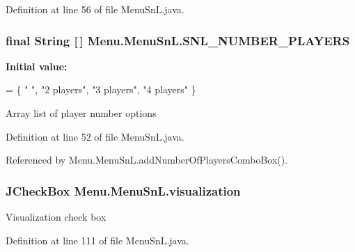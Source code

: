 Definition at line 56 of file Menu\+Sn\+L.\+java.

\hypertarget{class_menu_1_1_menu_sn_l_accdb88464884a651bab3a9ebb5eb2beb}{}
\subsubsection[{S\+N\+L\+\_\+\+N\+U\+M\+B\+E\+R\+\_\+\+P\+L\+A\+Y\+E\+R\+S}]{\setlength{\rightskip}{0pt plus 5cm}final String \mbox{[}$\,$\mbox{]} Menu.\+Menu\+Sn\+L.\+S\+N\+L\+\_\+\+N\+U\+M\+B\+E\+R\+\_\+\+P\+L\+A\+Y\+E\+R\+S\hspace{0.3cm}{\ttfamily [private]}}\label{class_menu_1_1_menu_sn_l_accdb88464884a651bab3a9ebb5eb2beb}
{\bfseries Initial value\+:}
\begin{DoxyCode}
= \{ \textcolor{stringliteral}{" "}, \textcolor{stringliteral}{"2 players"},
            \textcolor{stringliteral}{"3 players"}, \textcolor{stringliteral}{"4 players"} \}
\end{DoxyCode}
Array list of player number options 

Definition at line 52 of file Menu\+Sn\+L.\+java.



Referenced by Menu.\+Menu\+Sn\+L.\+add\+Number\+Of\+Players\+Combo\+Box().

\hypertarget{class_menu_1_1_menu_sn_l_a774bdc16dab9d1c0c882d2212beb70ac}{}
\subsubsection[{visualization}]{\setlength{\rightskip}{0pt plus 5cm}J\+Check\+Box Menu.\+Menu\+Sn\+L.\+visualization\hspace{0.3cm}{\ttfamily [private]}}\label{class_menu_1_1_menu_sn_l_a774bdc16dab9d1c0c882d2212beb70ac}
Visualization check box 

Definition at line 111 of file Menu\+Sn\+L.\+java.

\hypertarget{class_menu_1_1_menu_sn_l_a32c2e05c64b453df29d8b6df1061a939}{}

